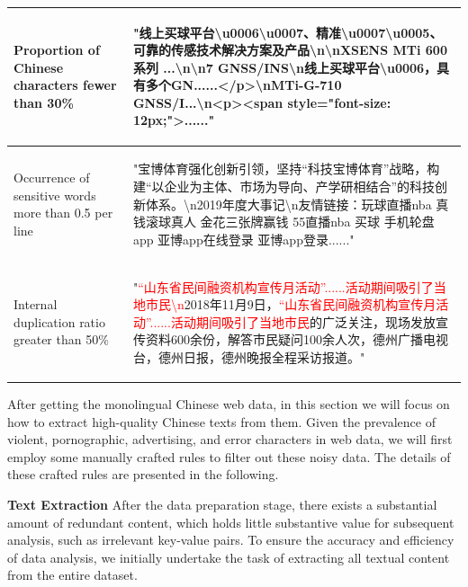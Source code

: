 \documentclass{article}
\begin{document}
\begin{table}[htbp]
\begin{tabular}{p{4cm} | p{9cm} }
     \midrule
     \multicolumn{1}{m{4cm}|}{Proportion of Chinese characters fewer than 30\%}  & \multicolumn{1}{m{9cm}}{\begin{CJK}{UTF8}{gbsn} "线上买球平台\textbackslash u0006\textbackslash u0007、精准\textbackslash u0007\textbackslash u0005、可靠的传感技术解决方案及产品\textbackslash n\textbackslash nXSENS MTi 600系列 ...\textbackslash n\textbackslash n7 GNSS/INS\textbackslash n线上买球平台\textbackslash u0006，具有多个GN......</p>\textbackslash nMTi-G-710 GNSS/I...\textbackslash n<p><span style="font-size: 12px;">......" \end{CJK}}  \\
     \midrule
     \multicolumn{1}{m{4cm}|}{Occurrence of sensitive words more than 0.5 per line}  & \multicolumn{1}{m{9cm}}{\begin{CJK}{UTF8}{gbsn} "宝博体育强化创新引领，坚持“科技宝博体育”战略，构建“以企业为主体、市场为导向、产学研相结合”的科技创新体系。\textbackslash n2019年度大事记\textbackslash n友情链接：玩球直播nba 真钱滚球真人 金花三张牌赢钱 55直播nba 买球 手机轮盘app 亚博app在线登录 亚博app登录......" \end{CJK}}  \\
     \midrule
     \multicolumn{1}{m{4cm}|}{Internal duplication ratio greater than 50\%}  & \multicolumn{1}{m{9cm}}{\begin{CJK}{UTF8}{gbsn} "\textcolor{red}{“山东省民间融资机构宣传月活动”......活动期间吸引了当地市民\textbackslash{}n}2018年11月9日，\textcolor{red}{“山东省民间融资机构宣传月活动”......活动期间吸引了当地市民}的广泛关注，现场发放宣传资料600余份，解答市民疑问100余人次，德州广播电视台，德州日报，德州晚报全程采访报道。" \end{CJK}} \\
     \bottomrule
    \end{tabular}
\end{table}


After getting the monolingual Chinese web data, in this section we will focus on how to extract high-quality Chinese texts from them. Given the prevalence of violent, pornographic, advertising, and error characters in web data, we will first employ some manually crafted rules to filter out these noisy data. The details of these crafted rules are presented in the following.

 \textbf{Text Extraction} After the data preparation stage, there exists a substantial amount of redundant content, which holds little substantive value for subsequent analysis, such as irrelevant key-value pairs. To ensure the accuracy and efficiency of data analysis, we initially undertake the task of extracting all textual content from the entire dataset.
\end{document}
